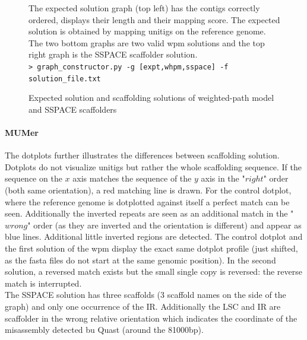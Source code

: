 \documentclass[12pt]{article}
\begin{document}
\begin{figure}[h!]
\begin{center}
{\begin{tikzpicture}
\end{tikzpicture}
}
\end{center}
\caption{Expected solution and scaffolding solutions of weighted-path model and SSPACE scaffolders}
\footnotesize The expected solution graph (top left) has the contigs correctly ordered, displays their length and their mapping score. The expected solution is obtained by mapping unitigs on the reference genome. The two bottom graphs are two valid wpm solutions and the top right graph is the SSPACE scaffolder solution. \\ \texttt{> graph\_constructor.py -g [expt,whpm,sspace] -f solution\_file.txt}

\label{fig:scafsols}
\end{figure}

\paragraph*{MUMer}
The dotplots further illustrates the differences between scaffolding solution. Dotplots do not visualize unitigs but rather the whole scaffolding sequence. If the sequence on the $x$ axis matches the sequence of the $y$ axis in the "$right$" order (both same orientation), a red matching line is drawn. For the control dotplot, where the reference genome is dotplotted against itself a perfect match can be seen. Additionally the inverted repeats are seen as an additional match in the "$wrong$" order (as they are inverted and the orientation is different) and appear as blue lines. Additional little inverted regions are detected. The control dotplot and the first solution of the wpm display the exact same dotplot profile (just shifted, as the fasta files do not start at the same genomic position). In the second solution, a reversed match exists but the small single copy is reversed: the reverse match is interrupted. \\ The SSPACE solution has three scaffolds (3 scaffold names on the side of the graph) and only one occurrence of the IR. Additionally the LSC and IR are scaffolder in the wrong relative orientation which indicates the coordinate of the misassembly detected bu Quast (around the 81000bp).
\end{document}
